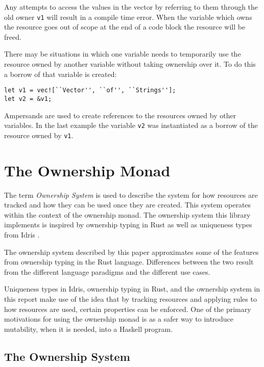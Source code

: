 \documentclass[onehalf,11pt]{beavtex}
\begin{document}
Any attempts to access the values in the vector by referring to them through
the old owner \texttt{v1} will result in a compile time error.
When the variable which owns the resource goes out of scope at the end of a
code block the resource will be freed.

There may be situations in which one variable needs to temporarily
use the resource owned by another variable without taking ownership over it.
To do this a borrow of that variable is created:

\begin{verbatim}
let v1 = vec![``Vector'', ``of'', ``Strings''];
let v2 = &v1;
\end{verbatim}

Ampersands are used to create references to the resources owned by other
variables.
In the last example the variable \texttt{v2} was instantiated as a borrow
of the resource owned by \texttt{v1}.



\chapter{The Ownership Monad}

The term \textit{Ownership System} is used to describe the system for how
resources are tracked and how they can be used once they are created. This
system operates within the context of the ownership monad.
The ownership system this library implements is inspired by
ownership typing in Rust \cite{rust_book_ownership}
as well as uniqueness types from Idris \cite{idris_uniqueness_types}.

The ownership system described by this paper approximates some of the
features from ownership typing in the Rust language. Differences between
the two result from the different language paradigms and the different use
cases.

Uniqueness types in Idris, ownership typing in Rust, and the ownership system in
this report make use of the idea that by tracking resources and applying rules
to how resources are used, certain properties can be enforced.
One of the primary motivations for using the ownership monad is as a
safer way to introduce mutability, when it is needed, into a Haskell program.


\section{The Ownership System}
\end{document}
